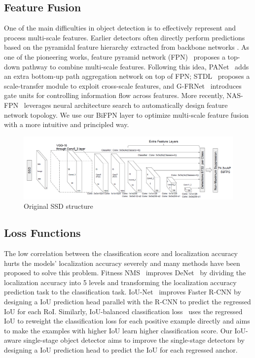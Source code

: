 \documentclass[journal,conference]{IEEEtran}
\begin{document}
\subsection{Feature Fusion}
One of the main difficulties in object detection is to effectively represent and process multi-scale features. Earlier detectors often directly perform predictions based on the pyramidal feature hierarchy extracted from backbone networks \cite{caiunified, liussd, sermanetoverfeat} . As one of the pioneering works, feature pyramid network (FPN)~\cite{linfeaturee} proposes a top-down pathway to combine multi-scale features. Following this idea, PANet~\cite{liupath} adds an extra bottom-up path aggregation network on top of FPN; STDL~\cite{zhouscale} proposes a scale-transfer module to exploit cross-scale features, and G-FRNet~\cite{amirulgated} introduces gate units for controlling information flow across features. More recently, NAS-FPN~\cite{ghiasifpn} leverages neural architecture search to automatically design feature network topology. We use our BiFPN layer to optimize multi-scale feature fusion with a more intuitive and principled way.

\begin{figure}[htbp]
  \centering
  \includegraphics[width=\linewidth]{fig/ssd.PNG}
  \caption{Original SSD structure}\label{fig:ssd}
\end{figure}

\subsection{Loss Functions}
The low correlation between the classification score and localization accuracy hurts the models' localization accuracy severely and many methods have been proposed to solve this problem. Fitness NMS~\cite{tychsenimproving} improves DeNet~\cite{tychsendenet} by dividing the localization accuracy into 5 levels and transforming the localization accuracy prediction task to the classification task. IoU-Net~\cite{jiangacquisition} improves Faster R-CNN by designing a IoU prediction head parallel with the R-CNN to predict the regressed IoU for each RoI. Similarly, IoU-balanced classification loss~\cite{wuiou} uses the regressed IoU to reweight the classification loss for each positive example directly and aims to make the examples with higher IoU learn higher classification score. Our IoU-aware single-stage object detector aims to improve the single-stage detectors by designing a IoU prediction head to predict the IoU for each regressed anchor.
\end{document}
